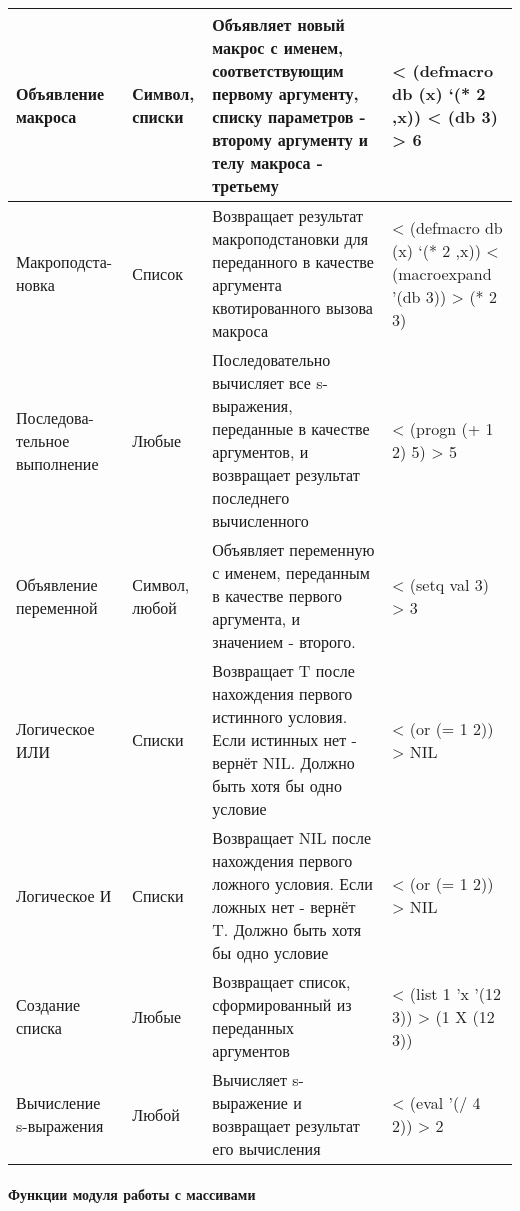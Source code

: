 \begin{xltabular}{\textwidth}{|p{3.6cm}|p{1.8cm}|p{6cm}|X|}
	Объявление макроса & Символ, списки & Объявляет новый макрос с именем, соответствующим первому аргументу, списку параметров - второму аргументу и телу макроса - третьему & < (defmacro db (x) `(* 2 ,x)) \linebreak < (db 3) \linebreak > 6 \\ \hline 
	Макроподста-\linebreak новка & Список & Возвращает результат макроподстановки для переданного в качестве аргумента квотированного вызова макроса & < (defmacro db (x) `(* 2 ,x)) \linebreak < (macroexpand '(db 3)) \linebreak > (* 2 3) \\ \hline 
	Последова-\linebreak тельное выполнение & Любые & Последовательно вычисляет все s-выражения, переданные в качестве аргументов, и возвращает результат последнего вычисленного & < (progn  (+ 1 2) 5) \linebreak > 5 \\ \hline 
	Объявление переменной & Символ, любой & Объявляет переменную с именем, переданным в качестве первого аргумента, и значением - второго. & < (setq val 3) \linebreak > 3 \\ \hline 
	Логическое ИЛИ & Списки & Возвращает T после нахождения первого истинного условия. Если истинных нет - вернёт NIL. Должно быть хотя бы одно условие & < (or (= 1 2)) \linebreak > NIL \\ \hline 
	Логическое И & Списки & Возвращает NIL после нахождения первого ложного условия. Если ложных нет - вернёт T. Должно быть хотя бы одно условие & < (or (= 1 2)) \linebreak > NIL \\ \hline 
	Создание списка & Любые & Возвращает список, сформированный из переданных аргументов & < (list 1 'x '(12 3)) \linebreak > (1 X (12 3)) \\ \hline 
	Вычисление s-выражения & Любой & Вычисляет s-выражение и возвращает результат его вычисления & < (eval '(/ 4 2)) \linebreak > 2 \\ \hline 
\end{xltabular}

\paragraph{Функции модуля работы с массивами}

